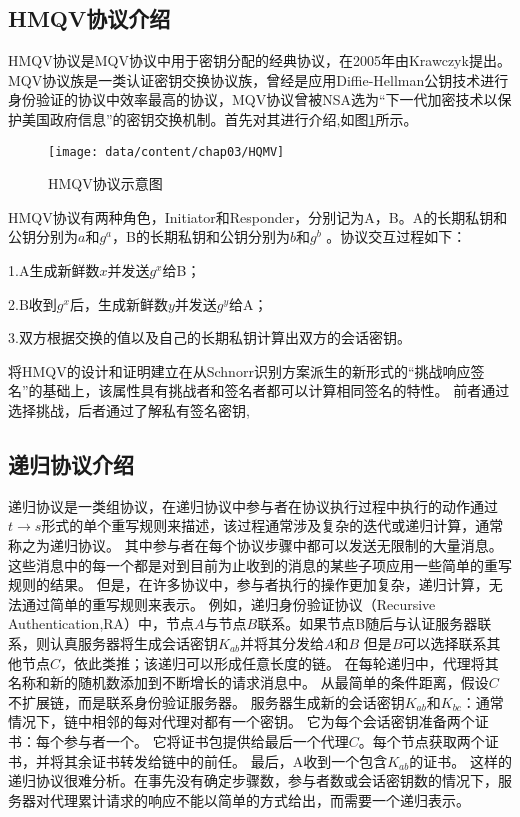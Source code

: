 \subsection{HMQV协议介绍}
HMQV协议是MQV协议中用于密钥分配的经典协议，在2005年由Krawczyk提出\cite{krawczyk2005hmqv}。
MQV协议族是一类认证密钥交换协议族，曾经是应用Diffie-Hellman公钥技术进行身份验证的协议中效率最高的协议，MQV协议曾被NSA选为“下一代加密技术以保护美国政府信息”的密钥交换机制。首先对其进行介绍,如图\ref{fig-HMQV}所示。
\begin{figure}[htp]
	\centering
	\texttt{[image: data/content/chap03/HQMV]}
	\caption{HMQV协议示意图}
	\label{fig-HMQV}
\end{figure}

HMQV协议有两种角色，Initiator和Responder，分别记为A，B。A的长期私钥和公钥分别为$a$和$g^a$，B的长期私钥和公钥分别为$b$和$g^b$ 。协议交互过程如下：

	1.A生成新鲜数$x$并发送$g^x$给B；

	2.B收到$g^x$后，生成新鲜数$y$并发送$g^y$给A；

	3.双方根据交换的值以及自己的长期私钥计算出双方的会话密钥。


将HMQV的设计和证明建立在从Schnorr识别方案派生的新形式的“挑战响应签名”的基础上，该属性具有挑战者和签名者都可以计算相同签名的特性。 前者通过选择挑战，后者通过了解私有签名密钥, 

\subsection{递归协议介绍}
递归协议是一类组协议，在递归协议中参与者在协议执行过程中执行的动作通过$t\to s$形式的单个重写规则来描述，该过程通常涉及复杂的迭代或递归计算，通常称之为递归协议。 其中参与者在每个协议步骤中都可以发送无限制的大量消息\cite{truderung2005selecting}。 这些消息中的每一个都是对到目前为止收到的消息的某些子项应用一些简单的重写规则的结果。
但是，在许多协议中，参与者执行的操作更加复杂，递归计算，无法通过简单的重写规则来表示。 例如，递归身份验证协议（Recursive Authentication,RA）中，节点$A$与节点$B$联系。如果节点B随后与认证服务器联系，则认真服务器将生成会话密钥$K_{ab}$并将其分发给$A$和$B$ 但是$B$可以选择联系其他节点$C$，依此类推；该递归可以形成任意长度的链。 在每轮递归中，代理将其名称和新的随机数添加到不断增长的请求消息中。
从最简单的条件距离，假设$C$不扩展链，而是联系身份验证服务器。 服务器生成新的会话密钥$K_{ab}$和$K_{bc}$：通常情况下，链中相邻的每对代理对都有一个密钥。 它为每个会话密钥准备两个证书：每个参与者一个。 它将证书包提供给最后一个代理$C$。每个节点获取两个证书，并将其余证书转发给链中的前任。 最后，A收到一个包含$K_{ab}$的证书。
这样的递归协议很难分析。在事先没有确定步骤数，参与者数或会话密钥数的情况下，服务器对代理累计请求的响应不能以简单的方式给出，而需要一个递归表示。


